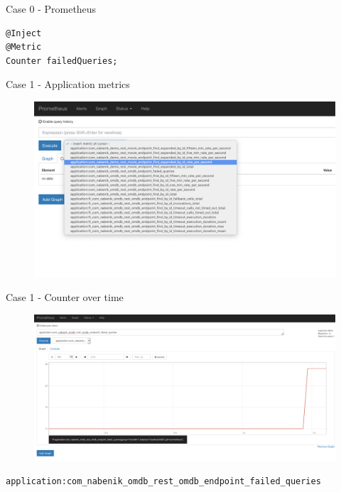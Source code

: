 \documentclass{beamer}
\begin{document}
\begin{frame}[fragile]{Case 0 - Prometheus}
\begin{lstlisting}
@Inject
@Metric
Counter failedQueries;
\end{lstlisting}
\end{frame}

\begin{frame}{Case 1 - Application metrics}
\begin{figure}
	\centering
	\includegraphics[width=\linewidth]{Images/micrometric1}
\end{figure}

\end{frame}

\begin{frame}{Case 1 - Counter over time}

\begin{figure}
	\centering
	\includegraphics[width=\linewidth]{Images/micrometric2}
\end{figure}
\lstinline|application:com_nabenik_omdb_rest_omdb_endpoint_failed_queries|
\end{frame}
\end{document}
